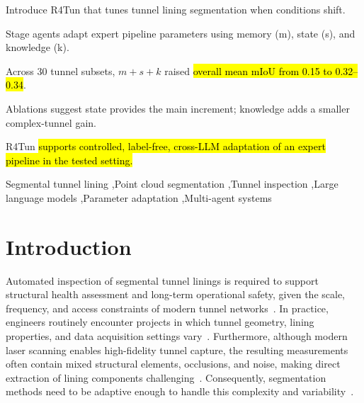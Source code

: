 \documentclass[a4paper,fleqn]{cas-dc}
\begin{document}
{%

\begin{highlights}
\item Introduce R4Tun that tunes tunnel lining segmentation when conditions shift.
\item Stage agents adapt expert pipeline parameters using memory (m), state (s), and knowledge (k).
\item Across 30 tunnel subsets, \mbox{$m+s+k$} raised \hl{overall mean mIoU from 0.15 to 0.32--0.34}.
\item Ablations suggest state provides the main increment; knowledge adds a smaller complex-tunnel gain.
\item R4Tun \hl{supports controlled, label-free, cross-LLM adaptation of an expert pipeline in the tested setting.}
\end
{highlights}


\begin{keywords}
Segmental tunnel lining \sep Point cloud segmentation \sep Tunnel inspection \sep Large language models \sep Parameter adaptation \sep Multi-agent systems
\end{keywords}
\date{\today}

\maketitle

\smallskip

\section{Introduction}\label{sec:intro}

Automated inspection of segmental tunnel linings is required to support structural health assessment and long-term operational safety, given the scale, frequency, and access constraints of modern tunnel networks~\cite{attard2018}. In practice, engineers routinely encounter projects in which tunnel geometry, lining properties, and data acquisition settings vary~\cite{weidner2024generalized}. Furthermore, although modern laser scanning enables high-fidelity tunnel capture, the resulting measurements often contain mixed structural elements, occlusions, and noise, making direct extraction of lining components challenging~\cite{huang2021bim,sjolander2023towards}. Consequently, segmentation methods need to be adaptive enough to handle this complexity and variability~\cite{montero2015, strauss2020sensing}.

}
\end{document}

